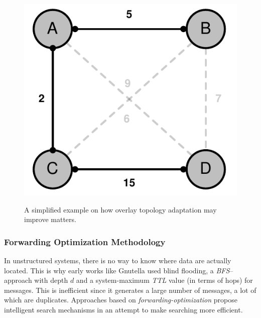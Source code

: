 \begin{figure}[ht]
{  \includegraphics[scale=0.36]{img/pdf/topology-adaptation-after.pdf}
  \label{figure:topology-adaptation:after}
}
\caption{A simplified example on how overlay topology adaptation may improve matters.}
\label{figure:topology-adaptation}
\end{figure}

\subsubsection{Forwarding Optimization Methodology}
In unstructured systems, there is no way to know where data are actually located. 
This is why early works like Gnutella \cite{gnutellav04} used blind flooding, 
a \emph{BFS}--approach with depth $d$ and a system-maximum \emph{TTL} value 
(in terms of hops) for messages. 
This is inefficient since it generates a large number of
messages, a lot of which are duplicates. 
Approaches based on \emph{forwarding-optimization} propose 
intelligent search mechanisms in an attempt to
make searching more efficient.

